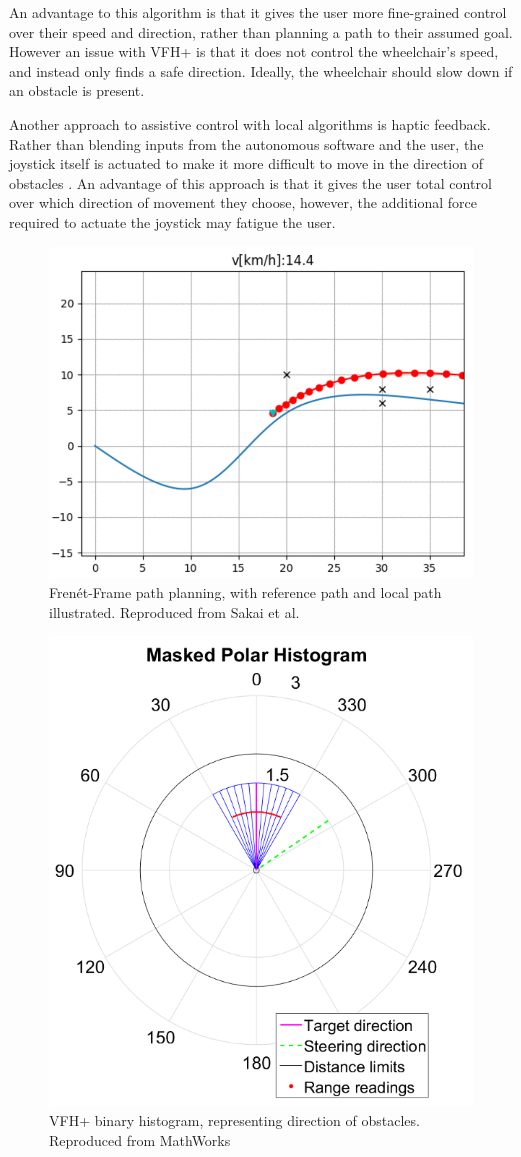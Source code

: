 \documentclass[12pt]{article}
\begin{document}
An advantage to this algorithm is that it gives the user more fine-grained control over their speed and direction,
rather than planning a path to their assumed goal.
However an issue with VFH+ is that it does not control the wheelchair's speed, and instead only finds a safe direction.
Ideally, the wheelchair should slow down if an obstacle is present.

Another approach to assistive control with local algorithms is haptic feedback. Rather than
blending inputs from the autonomous software and the user, the joystick itself is actuated
to make it more difficult to move in the direction of obstacles \cite{kondoNavigationGuidanceControl2008}\cite{vanderpoortenPoweredWheelchairNavigation2012}.
An advantage of this approach is that it gives the user total control over which direction of movement they choose,
however, the additional force required to actuate the joystick may fatigue the user.

\begin{figure}[H]
    \centering
    \includegraphics[width=0.5\linewidth]{images/frenet_frame_local_path.png}
    \caption{Fren\'et-Frame path planning, with reference path and local path illustrated. Reproduced from Sakai et al. \cite{sakaiPythonRoboticsPythonCode2018}}
    \label{fig:frenet_frame_local_path}
\end{figure}

\begin{figure}[H]
    \centering
    \includegraphics[width=0.35\linewidth]{images/binary_histogram_vfh.png}
    \caption{VFH+ binary histogram, representing direction of obstacles. Reproduced from MathWorks \cite{mathworksVectorFieldHistogram2022}}
    \label{fig:binary_histogram_vfh}
\end{figure}
\end{document}
